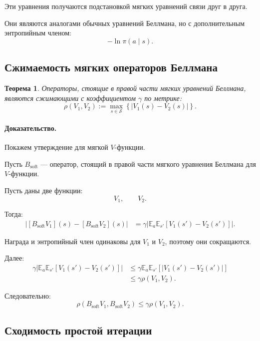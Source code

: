 \documentclass[12pt,a4paper]{article}
\newtheorem{theorem}{Теорема}
\begin{document}
Эти уравнения получаются подстановкой мягких уравнений связи друг в друга.

Они являются аналогами обычных уравнений Беллмана, но с дополнительным энтропийным членом:
\[
-\ln\pi(a\mid s).
\]

\subsection{Сжимаемость мягких операторов Беллмана}

\begin{theorem}
Операторы, стоящие в правой части мягких уравнений Беллмана, являются сжимающими с коэффициентом $\gamma$ по метрике:
\[
\rho(V_1,V_2)
:=
\max_{s\in\mathcal S}
\left\{
|V_1(s)-V_2(s)|
\right\}.
\]
\end{theorem}

\paragraph{Доказательство.}

Покажем утверждение для мягкой $V$-функции.

Пусть $B_{\mathrm{soft}}$ --- оператор, стоящий в правой части мягкого уравнения Беллмана для $V$-функции.

Пусть даны две функции:
\[
V_1,
\qquad
V_2.
\]

Тогда:
\[
\begin{aligned}
\left|
[B_{\mathrm{soft}}V_1](s)
-
[B_{\mathrm{soft}}V_2](s)
\right|
&=
\gamma
\left|
\mathbb E_a
\mathbb E_{s'}
\left[
V_1(s')-V_2(s')
\right]
\right|.
\end{aligned}
\]

Награда и энтропийный член одинаковы для $V_1$ и $V_2$, поэтому они сокращаются.

Далее:
\[
\begin{aligned}
\gamma
\left|
\mathbb E_a
\mathbb E_{s'}
\left[
V_1(s')-V_2(s')
\right]
\right|
&\le
\gamma
\mathbb E_a
\mathbb E_{s'}
\left[
|V_1(s')-V_2(s')|
\right]
\\
&\le
\gamma
\rho(V_1,V_2).
\end{aligned}
\]

Следовательно:
\[
\rho(B_{\mathrm{soft}}V_1,B_{\mathrm{soft}}V_2)
\le
\gamma\rho(V_1,V_2).
\]

\subsection{Сходимость простой итерации}
\end{document}
